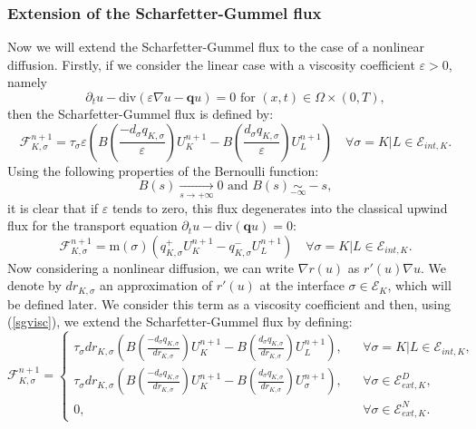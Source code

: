 \documentclass[smallextended]{svjour3}
\newcommand{\ds}{\displaystyle}
\def\pa{\partial}
\def\pa{\partial}
\begin{document}

\subsubsection{Extension of the Scharfetter-Gummel flux}

Now we will extend the Scharfetter-Gummel flux to the case of a nonlinear diffusion. Firstly, if we consider the linear case with a viscosity coefficient $\varepsilon>0$, namely 
\begin{equation*}
\pa_{t}u-\text{div}(\varepsilon \nabla u-\mathbf{q}u)=0 \text{ for } (x,t) \in \Omega \times (0,T),
\end{equation*}
then the Scharfetter-Gummel flux is defined by:
\begin{equation}
\mathcal{F}_{K,\sigma}^{n+1}= \tau_{\sigma} \varepsilon \left(B\left(\frac{-d_{\sigma}q_{K,\sigma}}{\varepsilon}\right)U_{K}^{n+1}-B\left(\frac{d_{\sigma}q_{K,\sigma}}{\varepsilon}\right)U_{L}^{n+1}\right) \quad \forall \sigma=K|L \in \mathcal{E}_{int,K}.
\label{sgvisc}
\end{equation}
Using the following properties of the Bernoulli function:
\begin{equation*}
B(s) \underset{s \rightarrow +\infty}{\longrightarrow} 0 \text{ and } B(s) \underset{-\infty}{\sim} -s,
\end{equation*}
it is clear that if $\varepsilon$ tends to zero, this flux degenerates into the classical upwind flux for the transport equation $\pa_{t}u-\text{div}(\textbf{q}u)=0$:
\begin{equation}
\mathcal{F}_{K,\sigma}^{n+1}= \text{m}(\sigma)\left(q_{K,\sigma}^{+}U_{K}^{n+1}-q_{K,\sigma}^{-}U_{L}^{n+1}\right) \quad \forall \sigma=K|L \in \mathcal{E}_{int,K}.
\label{upwindtransport}
\end{equation}
Now considering a nonlinear diffusion, we can write $\nabla r(u)$ as $r'(u) \nabla u$. We denote by $dr_{K,\sigma}$ an approximation of $r'(u)$ at the interface $\sigma \in \mathcal{E}_{K}$, which will be defined later. We consider this term as a viscosity coefficient and then, using (\ref{sgvisc}), we extend the Scharfetter-Gummel flux by defining:
\begin{equation}
\mathcal{F}_{K,\sigma}^{n+1}=\left\{\begin{array}{lll} \ds{\tau_{\sigma} dr_{K,\sigma} \left(B\left(\frac{-d_{\sigma}q_{K,\sigma}}{dr_{K,\sigma}}\right)U_{K}^{n+1}-B\left(\frac{d_{\sigma}q_{K,\sigma}}{dr_{K,\sigma}}\right)U_{L}^{n+1}\right),}& &  \forall \sigma=K|L \in \mathcal{E}_{int,K}, \\ \ds{\tau_{\sigma} dr_{K,\sigma} \left(B\left(\frac{-d_{\sigma}q_{K,\sigma}}{dr_{K,\sigma}}\right)U_{K}^{n+1}-B\left(\frac{d_{\sigma}q_{K,\sigma}}{dr_{K,\sigma}}\right)U_{\sigma}^{n+1}\right),}& &  \forall \sigma \in \mathcal{E}_{ext,K}^{D}, \\ 0, & & \forall \sigma \in \mathcal{E}_{ext,K}^{N}. \end{array}\right.
\label{sgext}
\end{equation}
\end{document}

